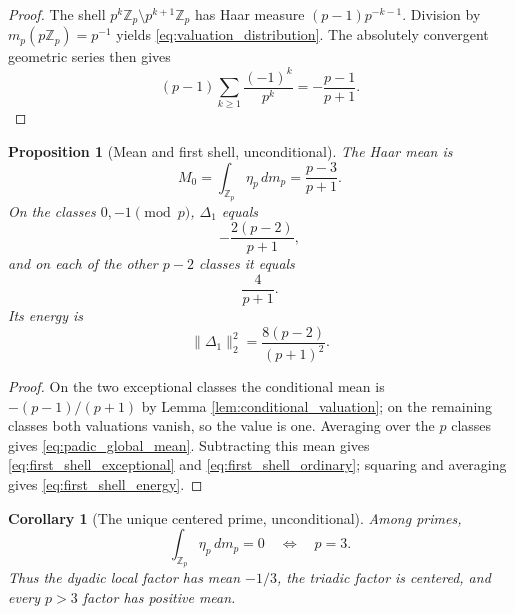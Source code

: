 \documentclass[11pt]{amsart}
\numberwithin{equation}{section}
\theoremstyle{plain}
\newtheorem{proposition}[theorem]{Proposition}
\newtheorem{corollary}[theorem]{Corollary}
\theoremstyle{definition}
\theoremstyle{remark}
\newcommand{\Z}{\mathbb Z}
\begin{document}
\begin{proof}
The shell $p^k\Z_p\setminus p^{k+1}\Z_p$ has Haar measure $(p-1)p^{-k-1}$.  Division by $m_p(p\Z_p)=p^{-1}$ yields \eqref{eq:valuation_distribution}.  The absolutely convergent geometric series then gives
\begin{equation}
(p-1)\sum_{k\ge1}\frac{(-1)^k}{p^k}=-\frac{p-1}{p+1}.
\label{eq:conditional_valuation_series}
\end{equation}
\end{proof}

\begin{proposition}[Mean and first shell, unconditional]
\label{prop:padic_mean_first_shell}
The Haar mean is
\begin{equation}
M_0=\int_{\Z_p}\eta_p\,dm_p=\frac{p-3}{p+1}.
\label{eq:padic_global_mean}
\end{equation}
On the classes $0,-1\pmod p$, $\Delta_1$ equals
\begin{equation}
-\frac{2(p-2)}{p+1},
\label{eq:first_shell_exceptional}
\end{equation}
and on each of the other $p-2$ classes it equals
\begin{equation}
\frac4{p+1}.
\label{eq:first_shell_ordinary}
\end{equation}
Its energy is
\begin{equation}
\|\Delta_1\|_2^2=\frac{8(p-2)}{(p+1)^2}.
\label{eq:first_shell_energy}
\end{equation}
\end{proposition}

\begin{proof}
On the two exceptional classes the conditional mean is $-(p-1)/(p+1)$ by Lemma \ref{lem:conditional_valuation}; on the remaining classes both valuations vanish, so the value is one.  Averaging over the $p$ classes gives \eqref{eq:padic_global_mean}.  Subtracting this mean gives \eqref{eq:first_shell_exceptional} and \eqref{eq:first_shell_ordinary}; squaring and averaging gives \eqref{eq:first_shell_energy}.
\end{proof}

\begin{corollary}[The unique centered prime, unconditional]
\label{cor:unique_centered_prime}
Among primes,
\begin{equation}
\int_{\Z_p}\eta_p\,dm_p=0
\quad\Longleftrightarrow\quad
p=3.
\label{eq:unique_centered_prime}
\end{equation}
Thus the dyadic local factor has mean $-1/3$, the triadic factor is centered, and every $p>3$ factor has positive mean.
\end{corollary}
\end{document}
